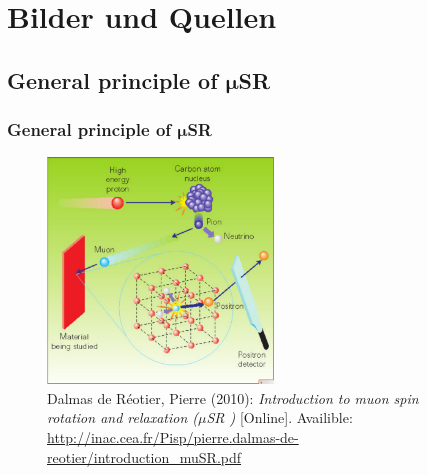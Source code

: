 \documentclass[11pt]{beamer}
\newcommand{\musr}{$\mu$SR }
\begin{document}
\section{Bilder und Quellen}
\subsection{General principle of $\mathbf{\mu}$SR}
\begin{frame}[fragile]
	\frametitle{General principle of $\mathbf{\mu}$SR}
	\begin{figure}[!htb]
		\begin{center}
			\includegraphics[height=6cm, keepaspectratio]{Bilder/musr_general_principle.png}%
			\caption*{  \setlength{\baselineskip}{6pt}
				{\tiny Dalmas de Réotier, Pierre (2010): \textit{Introduction to muon spin rotation and relaxation (\musr)} [Online]. Availible: \url{http://inac.cea.fr/Pisp/pierre.dalmas-de-				reotier/introduction_muSR.pdf}}
			}%
		\end{center}
	\end{figure}          
\end{frame}
\end{document}
